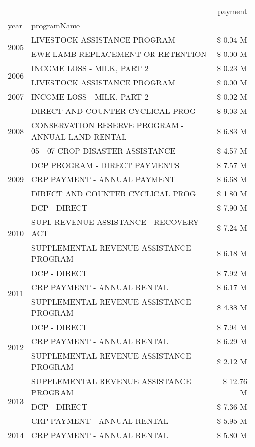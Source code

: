 \begin{tabular}{llr}
\toprule
 &  & payment \\
year & programName &  \\
\midrule
\multirow[t]{2}{*}{2005} & LIVESTOCK ASSISTANCE PROGRAM & \$ 0.04 M \\
 & EWE LAMB REPLACEMENT OR RETENTION & \$ 0.00 M \\
\cline{1-3}
\multirow[t]{2}{*}{2006} & INCOME LOSS - MILK, PART 2 & \$ 0.23 M \\
 & LIVESTOCK ASSISTANCE PROGRAM & \$ 0.00 M \\
\cline{1-3}
2007 & INCOME LOSS - MILK, PART 2 & \$ 0.02 M \\
\cline{1-3}
\multirow[t]{3}{*}{2008} & DIRECT AND COUNTER CYCLICAL PROG & \$ 9.03 M \\
 & CONSERVATION RESERVE PROGRAM - ANNUAL LAND RENTAL & \$ 6.83 M \\
 & 05 - 07 CROP DISASTER ASSISTANCE & \$ 4.57 M \\
\cline{1-3}
\multirow[t]{3}{*}{2009} & DCP PROGRAM - DIRECT PAYMENTS & \$ 7.57 M \\
 & CRP PAYMENT - ANNUAL PAYMENT & \$ 6.68 M \\
 & DIRECT AND COUNTER CYCLICAL PROG & \$ 1.80 M \\
\cline{1-3}
\multirow[t]{3}{*}{2010} & DCP - DIRECT & \$ 7.90 M \\
 & SUPL REVENUE ASSISTANCE - RECOVERY ACT & \$ 7.24 M \\
 & SUPPLEMENTAL REVENUE ASSISTANCE PROGRAM & \$ 6.18 M \\
\cline{1-3}
\multirow[t]{3}{*}{2011} & DCP - DIRECT & \$ 7.92 M \\
 & CRP PAYMENT - ANNUAL RENTAL & \$ 6.17 M \\
 & SUPPLEMENTAL REVENUE ASSISTANCE PROGRAM & \$ 4.88 M \\
\cline{1-3}
\multirow[t]{3}{*}{2012} & DCP - DIRECT & \$ 7.94 M \\
 & CRP PAYMENT - ANNUAL RENTAL & \$ 6.29 M \\
 & SUPPLEMENTAL REVENUE ASSISTANCE PROGRAM & \$ 2.12 M \\
\cline{1-3}
\multirow[t]{3}{*}{2013} & SUPPLEMENTAL REVENUE ASSISTANCE PROGRAM & \$ 12.76 M \\
 & DCP - DIRECT & \$ 7.36 M \\
 & CRP PAYMENT - ANNUAL RENTAL & \$ 5.95 M \\
\cline{1-3}
\multirow[t]{3}{*}{2014} & CRP PAYMENT - ANNUAL RENTAL & \$ 5.80 M \\

\end{tabular}
